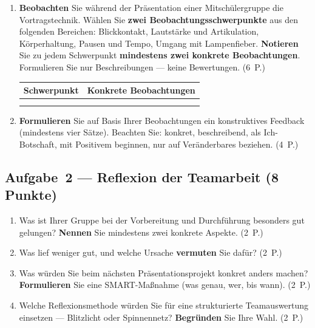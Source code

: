 \documentclass[11pt, a4paper]{article}
\begin{document}
\begin{enumerate}[label=(\alph*)]
  \item \textbf{Beobachten} Sie während der Präsentation einer Mitschülergruppe die Vortragstechnik.
  Wählen Sie \textbf{zwei Beobachtungsschwerpunkte} aus den folgenden Bereichen:
  Blickkontakt, Lautstärke und Artikulation, Körperhaltung, Pausen und Tempo,
  Umgang mit Lampenfieber. \textbf{Notieren} Sie zu jedem Schwerpunkt \textbf{mindestens zwei
  konkrete Beobachtungen}. Formulieren Sie nur Beschreibungen --- keine Bewertungen. \hfill (6~P.)

  \bigskip

  \noindent
  \begin{tabular}{|p{3.5cm}|p{9.5cm}|}
  \hline
  \textbf{Schwerpunkt} & \textbf{Konkrete Beobachtungen}\\
  \hline
  & \\[3.5cm]
  \hline
  & \\[3.5cm]
  \hline
  \end{tabular}

  \bigskip

  \item \textbf{Formulieren} Sie auf Basis Ihrer Beobachtungen ein konstruktives Feedback
  (mindestens vier Sätze). Beachten Sie: konkret, beschreibend, als Ich-Botschaft,
  mit Positivem beginnen, nur auf Veränderbares beziehen. \hfill (4~P.)

  \vspace{7cm}
\end{enumerate}

\subsection*{Aufgabe~2 --- Reflexion der Teamarbeit (8 Punkte)}

\begin{enumerate}[label=(\alph*)]
  \item Was ist Ihrer Gruppe bei der Vorbereitung und Durchführung besonders gut gelungen?
  \textbf{Nennen} Sie mindestens zwei konkrete Aspekte. \hfill (2~P.)

  \vspace{4cm}

  \item Was lief weniger gut, und welche Ursache \textbf{vermuten} Sie dafür? \hfill (2~P.)

  \vspace{4cm}

  \item Was würden Sie beim nächsten Präsentationsprojekt konkret anders machen?
  \textbf{Formulieren} Sie eine SMART-Maßnahme (was genau, wer, bis wann). \hfill (2~P.)

  \vspace{4cm}

  \item Welche Reflexionsmethode würden Sie für eine strukturierte Teamauswertung einsetzen ---
  Blitzlicht oder Spinnennetz? \textbf{Begründen} Sie Ihre Wahl. \hfill (2~P.)

  \vspace{4cm}
\end{enumerate}
\end{document}

